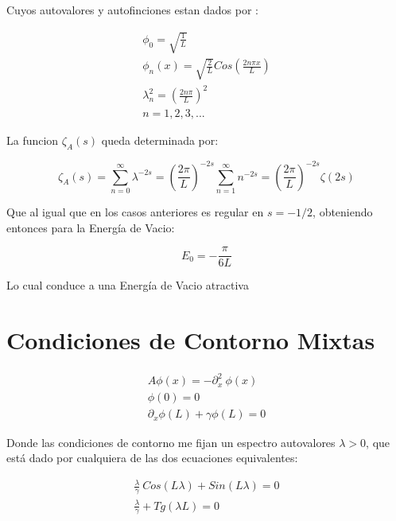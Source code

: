 Cuyos autovalores y autofinciones estan dados por  : 

\begin{equation}
\begin{array}{c}
	\phi _{0} = \sqrt{\frac{1}{L}} \\ 
	\phi _{n} (x) = \sqrt{\frac{2}{L}} Cos( \frac{2 n \pi x}{L} ) \\
	\lambda _n ^2 = \left( \frac{2 n \pi }{L} \right) ^2 \\
	n = 1,2,3, ...
\end{array}
\end{equation}

La funcion $\zeta _A (s)$ queda determinada por:

\begin{equation}
\zeta _A (s) = 
\sum _{n=0} ^{\infty} \lambda ^{-2s} =  
\left( \frac{2 \pi}{L} \right) ^{-2s} \sum _{n=1} ^{\infty} n ^{-2s} = 
\left( \frac{2 \pi}{L} \right) ^{-2s} \zeta (2s)
\end{equation}

Que al igual que en los casos anteriores es regular en $s=-1/2$, obteniendo entonces para la Energía de Vacio:

\begin{equation}
E _0 = - \frac{\pi}{6 L}
\end{equation}

Lo cual conduce a una Energía de Vacio atractiva

\section{Condiciones de Contorno Mixtas}

\begin{equation}
\begin{array}{c}
    A \phi (x) = - \partial ^2 _x \ \phi (x)  \\
    \phi (0) = 0 \\ 
    \partial _x \phi (L) + \gamma \phi (L) = 0
\end{array}
\end{equation}

Donde las condiciones de contorno me fijan un espectro autovalores $\lambda > 0 $, que está dado por  cualquiera de las dos ecuaciones equivalentes: 

\begin{equation}
\begin{array}{cc}
    \frac{\lambda}{\gamma}  \ Cos( L \lambda ) +   Sin( L \lambda ) = 0 \\
    \frac{\lambda}{\gamma}  + Tg(\lambda L )  = 0 
\label{autovalores}
\end{array}
\end{equation}




